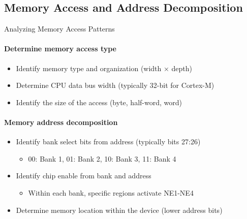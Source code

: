 \subsection{Memory Access and Address Decomposition}

\begin{KR}{Analyzing Memory Access Patterns}
\paragraph{Determine memory access type}
\begin{itemize}
    \item Identify memory type and organization (width × depth)
    \item Determine CPU data bus width (typically 32-bit for Cortex-M)
    \item Identify the size of the access (byte, half-word, word)
\end{itemize}

\paragraph{Memory address decomposition}
\begin{itemize}
    \item Identify bank select bits from address (typically bits 27:26)
    \begin{itemize}
        \item 00: Bank 1, 01: Bank 2, 10: Bank 3, 11: Bank 4
    \end{itemize}
    \item Identify chip enable from bank and address
    \begin{itemize}
        \item Within each bank, specific regions activate NE1-NE4
    \end{itemize}
    \item Determine memory location within the device (lower address bits)
\end{itemize}


\end{KR}

